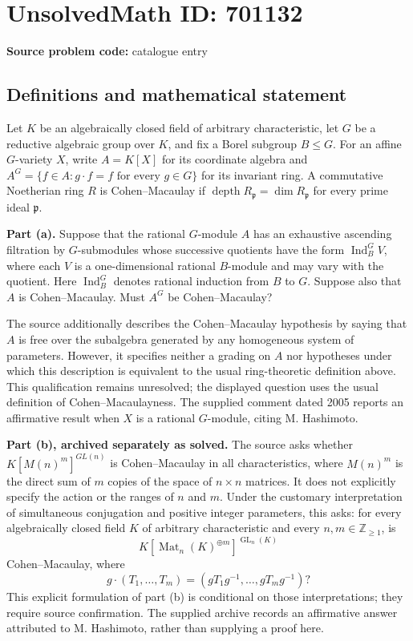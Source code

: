\documentclass[11pt]{article}
\begin{document}
\section*{UnsolvedMath ID: 701132}
\textbf{Source problem code:} catalogue entry
\subsection{Definitions and mathematical statement}
Let \(K\) be an algebraically closed field of arbitrary characteristic, let \(G\) be a reductive algebraic group over \(K\), and fix a Borel subgroup \(B\leq G\). For an affine \(G\)-variety \(X\), write \(A=K[X]\) for its coordinate algebra and \(A^G=\{f\in A:g\cdot f=f\text{ for every }g\in G\}\) for its invariant ring. A commutative Noetherian ring \(R\) is Cohen--Macaulay if \(\operatorname{depth}R_{\mathfrak p}=\dim R_{\mathfrak p}\) for every prime ideal \(\mathfrak p\).

\textbf{Part (a).} Suppose that the rational \(G\)-module \(A\) has an exhaustive ascending filtration by \(G\)-submodules whose successive quotients have the form \(\operatorname{Ind}_B^G V\), where each \(V\) is a one-dimensional rational \(B\)-module and may vary with the quotient. Here \(\operatorname{Ind}_B^G\) denotes rational induction from \(B\) to \(G\). Suppose also that \(A\) is Cohen--Macaulay. Must \(A^G\) be Cohen--Macaulay?

The source additionally describes the Cohen--Macaulay hypothesis by saying that \(A\) is free over the subalgebra generated by any homogeneous system of parameters. However, it specifies neither a grading on \(A\) nor hypotheses under which this description is equivalent to the usual ring-theoretic definition above. This qualification remains unresolved; the displayed question uses the usual definition of Cohen--Macaulayness. The supplied comment dated 2005 reports an affirmative result when \(X\) is a rational \(G\)-module, citing M. Hashimoto.

\textbf{Part (b), archived separately as solved.} The source asks whether \(K[M(n)^m]^{GL(n)}\) is Cohen--Macaulay in all characteristics, where \(M(n)^m\) is the direct sum of \(m\) copies of the space of \(n\times n\) matrices. It does not explicitly specify the action or the ranges of \(n\) and \(m\). Under the customary interpretation of simultaneous conjugation and positive integer parameters, this asks: for every algebraically closed field \(K\) of arbitrary characteristic and every \(n,m\in\mathbb Z_{\geq1}\), is
\[
K[\operatorname{Mat}_n(K)^{\oplus m}]^{\operatorname{GL}_n(K)}
\]
Cohen--Macaulay, where
\[
g\cdot(T_1,\ldots,T_m)=(gT_1g^{-1},\ldots,gT_mg^{-1})?
\]
This explicit formulation of part (b) is conditional on those interpretations; they require source confirmation. The supplied archive records an affirmative answer attributed to M. Hashimoto, rather than supplying a proof here.
\end{document}
